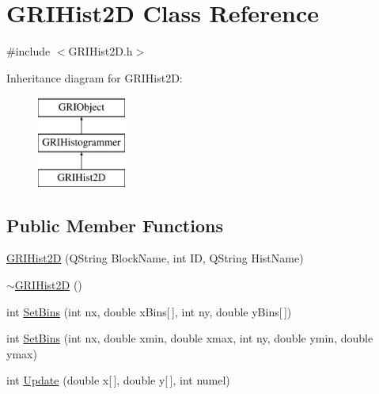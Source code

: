 \hypertarget{classGRIHist2D}{\section{\-G\-R\-I\-Hist2\-D \-Class \-Reference}
\label{classGRIHist2D}
}


{\ttfamily \#include $<$\-G\-R\-I\-Hist2\-D.\-h$>$}

\-Inheritance diagram for \-G\-R\-I\-Hist2\-D\-:\begin{figure}[H]
\begin{center}
\leavevmode
\includegraphics[height=3.000000cm]{classGRIHist2D}
\end{center}
\end{figure}
\subsection*{\-Public \-Member \-Functions}
\begin{DoxyCompactItemize}
\item 
\hyperlink{classGRIHist2D_a8e9c1b91a08ec8e1fd1d8d6457955060}{\-G\-R\-I\-Hist2\-D} (\-Q\-String \-Block\-Name, int \-I\-D, \-Q\-String \-Hist\-Name)
\item 
\hyperlink{classGRIHist2D_a9ad223457b97a16da93f0cc3fd06e29a}{$\sim$\-G\-R\-I\-Hist2\-D} ()
\item 
int \hyperlink{classGRIHist2D_afc65c874fd9218388fb83123be02307d}{\-Set\-Bins} (int nx, double x\-Bins\mbox{[}$\,$\mbox{]}, int ny, double y\-Bins\mbox{[}$\,$\mbox{]})
\item 
int \hyperlink{classGRIHist2D_a921efa419b5d615551c254290c7c2d93}{\-Set\-Bins} (int nx, double xmin, double xmax, int ny, double ymin, double ymax)
\item 
int \hyperlink{classGRIHist2D_aa66e120a1edd3ba419e5c73d13c469e2}{\-Update} (double x\mbox{[}$\,$\mbox{]}, double y\mbox{[}$\,$\mbox{]}, int numel)
\end{DoxyCompactItemize}


